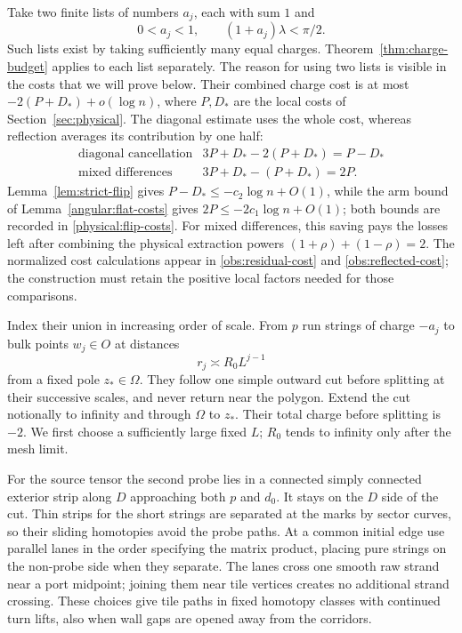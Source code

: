 Take two finite lists of numbers $a_j$, each with sum $1$ and
\begin{equation}
 0<a_j<1,\qquad (1+a_j)\lambda<\pi/2.
\label{obs:small-charges}
\end{equation}
Such lists exist by taking sufficiently many equal charges.
Theorem~\ref{thm:charge-budget} applies to each list separately.
The reason for using two lists is visible in the costs that we will
prove below.  Their combined charge cost is at most
$-2(P+D_*)+o(\log n)$, where $P,D_*$ are the local costs of
Section~\ref{sec:physical}.  The diagonal estimate uses the whole
cost, whereas reflection averages its contribution by one half:
\[
 \begin{array}{c|c}
 \text{diagonal cancellation}&3P+D_*-2(P+D_*)=P-D_*\\
 \text{mixed differences}&3P+D_*-(P+D_*)=2P.
 \end{array}
\]
Lemma~\ref{lem:strict-flip} gives
$P-D_*\le-c_2\log n+O(1)$, while the arm bound of
Lemma~\ref{angular:flat-costs} gives $2P\le-2c_1\log n+O(1)$;
both bounds are recorded in \eqref{physical:flip-costs}.
For mixed differences, this saving pays
the losses left after combining the physical extraction powers
$(1+\rho)+(1-\rho)=2$.  The normalized cost calculations appear in
\eqref{obs:residual-cost} and \eqref{obs:reflected-cost}; the construction
must retain the positive local factors needed for those comparisons.

Index their union in increasing order of scale.  From $p$ run strings
of charge $-a_j$ to bulk points $w_j\in O$ at distances
\begin{equation}
 r_j\asymp R_0L^{j-1}
 \label{obs:endpoint-scales}
\end{equation}
from a fixed pole $z_*\in\Omega$.  They follow one simple outward
cut before splitting at their successive scales, and never return
near the polygon.  Extend the cut notionally to infinity and through
$\Omega$ to $z_*$.  Their total charge before splitting is $-2$.
We first choose a sufficiently large fixed $L$; $R_0$ tends to infinity
only after the mesh limit.

For the source tensor the second probe lies in a connected simply
connected exterior strip along $D$ approaching both $p$ and $d_0$.
It stays on the $D$ side of the cut.  Thin strips for the short strings
are separated at the marks by sector curves, so their sliding
homotopies avoid the probe paths.  At a common initial edge use
parallel lanes in the order specifying the matrix product, placing
pure strings on the non-probe side when they separate.  The lanes
cross one smooth raw strand near a port midpoint; joining them near
tile vertices creates no additional strand crossing.  These choices
give tile paths in fixed homotopy classes with continued turn lifts,
also when wall gaps are opened away from the corridors.

